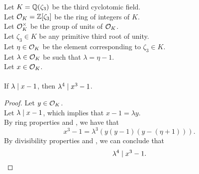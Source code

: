 \begin{lemma}
    \label{lmm:lambda_pow_four_dvd_cube_sub_one_of_dvd_sub_one}
    \leanok
    Let $K = \mathbb{Q}(\zeta_3)$ be the third cyclotomic field. \\
    Let $\mathcal{O}_K = \mathbb{Z}[\zeta_3]$ be the ring of integers of $K$. \\
    Let $\mathcal{O}^\times_K$ be the group of units of $\mathcal{O}_K$. \\
    Let $\zeta_3 \in K$ be any primitive third root of unity. \\
    Let $\eta \in \mathcal{O}_K$ be the element corresponding to $\zeta_3 \in K$. \\
    Let $\lambda \in \mathcal{O}_K$ be such that $\lambda = \eta -1$. \\
    Let $x \in \mathcal{O}_K$. \\\\
    If $\lambda\mid x - 1$, then $\lambda^ 4 \mid x^3 - 1$.
\end{lemma}
\begin{proof}
    \leanok
    Let $y\in \mathcal{O}_K$. \\
    Let $\lambda \mid x - 1$, which implies that $x - 1 = \lambda y$. \\
    By ring properties and , we have that
    $$x^3 - 1 = \lambda^3 (y (y - 1) (y - (\eta + 1))).$$
    By divisibility properties and ,
    we can conclude that $$\lambda^ 4 \mid x^3 - 1.$$
\end{proof}

